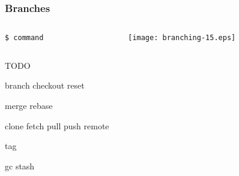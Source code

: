 \documentclass[english]{beamer}
\newcommand{\cmd}[1]{%
\texttt{\textcolor{code-orange}{#1}}%
}
\begin{document}
\begin{frame}
\frametitle{Branches}

\begin{columns}[t]
        \begin{column}[T]{.5\textwidth}
                \cmd{\$ command} \\
        \end{column}
        \begin{column}[T]{.5\textwidth}
                \texttt{[image: branching-15.eps]}
        \end{column}
\end{columns}
\end{frame}


\begin{frame}
        TODO

branch
checkout
reset

merge
rebase

clone
fetch
pull
push
remote

tag

gc
stash


\end{frame}

\end{document}
